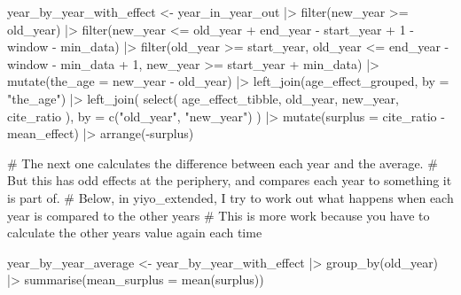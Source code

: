 \documentclass[
  10pt,
  letterpaper,
  DIV=11,
  numbers=noendperiod,
  twoside]{scrartcl}
\newenvironment{Shaded}{\begin{snugshade}}{\end{snugshade}}
\newcommand{\AttributeTok}[1]{\textcolor[rgb]{0.40,0.45,0.13}{#1}}
\newcommand{\CommentTok}[1]{\textcolor[rgb]{0.37,0.37,0.37}{#1}}
\newcommand{\DecValTok}[1]{\textcolor[rgb]{0.68,0.00,0.00}{#1}}
\newcommand{\FunctionTok}[1]{\textcolor[rgb]{0.28,0.35,0.67}{#1}}
\newcommand{\NormalTok}[1]{\textcolor[rgb]{0.00,0.23,0.31}{#1}}
\newcommand{\OtherTok}[1]{\textcolor[rgb]{0.00,0.23,0.31}{#1}}
\newcommand{\SpecialCharTok}[1]{\textcolor[rgb]{0.37,0.37,0.37}{#1}}
\newcommand{\StringTok}[1]{\textcolor[rgb]{0.13,0.47,0.30}{#1}}
\begin{document}
\begin{Shaded}
\begin{Highlighting}[]
\NormalTok{year\_by\_year\_with\_effect }\OtherTok{\textless{}{-}}\NormalTok{ year\_in\_year\_out }\SpecialCharTok{|\textgreater{}}
  \FunctionTok{filter}\NormalTok{(new\_year }\SpecialCharTok{\textgreater{}=}\NormalTok{ old\_year) }\SpecialCharTok{|\textgreater{}}
  \FunctionTok{filter}\NormalTok{(new\_year }\SpecialCharTok{\textless{}=}\NormalTok{ old\_year }\SpecialCharTok{+}\NormalTok{ end\_year }\SpecialCharTok{{-}}\NormalTok{ start\_year }\SpecialCharTok{+} \DecValTok{1} \SpecialCharTok{{-}}\NormalTok{ window }\SpecialCharTok{{-}}\NormalTok{ min\_data) }\SpecialCharTok{|\textgreater{}}
  \FunctionTok{filter}\NormalTok{(old\_year }\SpecialCharTok{\textgreater{}=}\NormalTok{ start\_year, old\_year }\SpecialCharTok{\textless{}=}\NormalTok{ end\_year }\SpecialCharTok{{-}}\NormalTok{ window }\SpecialCharTok{{-}}\NormalTok{ min\_data }\SpecialCharTok{+} \DecValTok{1}\NormalTok{, new\_year }\SpecialCharTok{\textgreater{}=}\NormalTok{ start\_year }\SpecialCharTok{+}\NormalTok{ min\_data) }\SpecialCharTok{|\textgreater{}}
  \FunctionTok{mutate}\NormalTok{(}\AttributeTok{the\_age =}\NormalTok{ new\_year }\SpecialCharTok{{-}}\NormalTok{ old\_year) }\SpecialCharTok{|\textgreater{}}
  \FunctionTok{left\_join}\NormalTok{(age\_effect\_grouped, }\AttributeTok{by =} \StringTok{"the\_age"}\NormalTok{) }\SpecialCharTok{|\textgreater{}}
  \FunctionTok{left\_join}\NormalTok{(}
    \FunctionTok{select}\NormalTok{(}
\NormalTok{      age\_effect\_tibble, old\_year, new\_year, cite\_ratio}
\NormalTok{    ), }\AttributeTok{by =} \FunctionTok{c}\NormalTok{(}\StringTok{"old\_year"}\NormalTok{, }\StringTok{"new\_year"}\NormalTok{)}
\NormalTok{  ) }\SpecialCharTok{|\textgreater{}}
  \FunctionTok{mutate}\NormalTok{(}\AttributeTok{surplus =}\NormalTok{ cite\_ratio }\SpecialCharTok{{-}}\NormalTok{ mean\_effect) }\SpecialCharTok{|\textgreater{}}
  \FunctionTok{arrange}\NormalTok{(}\SpecialCharTok{{-}}\NormalTok{surplus)}

\CommentTok{\# The next one calculates the difference between each year and the average. }
\CommentTok{\# But this has odd effects at the periphery, and compares each year to something it is part of.}
\CommentTok{\# Below, in yiyo\_extended, I try to work out what happens when each year is compared to the other years}
\CommentTok{\# This is more work because you have to calculate the \textquotesingle{}other years\textquotesingle{} value again each time}

\NormalTok{year\_by\_year\_average }\OtherTok{\textless{}{-}}\NormalTok{ year\_by\_year\_with\_effect }\SpecialCharTok{|\textgreater{}}
  \FunctionTok{group\_by}\NormalTok{(old\_year) }\SpecialCharTok{|\textgreater{}}
  \FunctionTok{summarise}\NormalTok{(}\AttributeTok{mean\_surplus =} \FunctionTok{mean}\NormalTok{(surplus))}


\end{Highlighting}
\end{Shaded}
\end{document}
